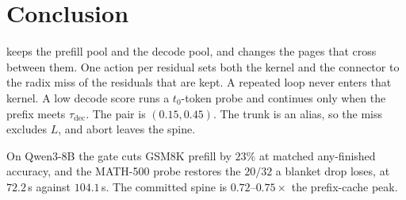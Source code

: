 \section{Conclusion}
\label{sec:conclusion}

\sys keeps the prefill pool and the decode pool, and changes the pages that cross between them.
One action per residual sets both the kernel and the connector to the radix miss of the residuals that are kept.
A repeated loop never enters that kernel.
A low decode score runs a $t_0$-token probe and continues only when the prefix meets $\tau_{\mathrm{dec}}$.
The pair is $(0.15, 0.45)$.
The trunk is an alias, so the miss excludes $L$, and abort leaves the spine.

On Qwen3-8B the gate cuts GSM8K prefill by $23\%$ at matched any-finished accuracy, and the MATH-500 probe restores the $20/32$ a blanket drop loses, at $72.2$\,s against $104.1$\,s.
The committed spine is $0.72$--$0.75\times$ the prefix-cache peak.

